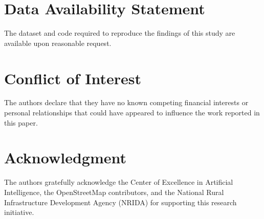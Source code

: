 \documentclass[conference]{IEEEtran}
\begin{document}
\section*{Data Availability Statement}
The dataset and code required to reproduce the findings of this study are available upon reasonable request.

\section*{Conflict of Interest}
The authors declare that they have no known competing financial interests or personal relationships that could have appeared to influence the work reported in this paper.

\section*{Acknowledgment}
The authors gratefully acknowledge the Center of Excellence in Artificial Intelligence, the OpenStreetMap contributors, and the National Rural Infrastructure Development Agency (NRIDA) for supporting this research initiative.
\end{document}
